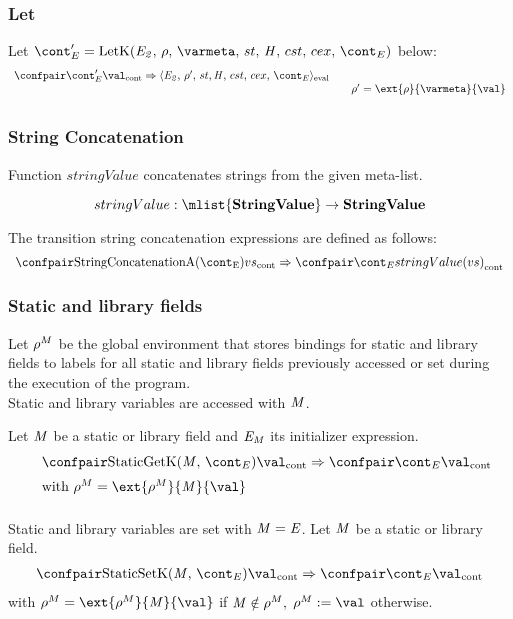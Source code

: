\documentclass{article}
\newcommand{\cesktrans}[2]{\ensuremath{{#1} \Rightarrow {#2}}}
\begin{document}
\subsubsection{Let}
Let $\econt' = \LetK{\expri{2}}{\env}{\varmeta}{\econt}$ below:
\[
  \begin{array}{rcl}
	\cesktrans{
		\contconf{\econt'}{\val}}{
		\evalconf{\expri{2}}{\env'}{\strace}{\cstrace}{\cex}{\econt}}
		\\
	&&\env'=\ext{\env}{\varmeta}{\val}\\[2mm]
  \end{array}
\]
\subsubsection{String Concatenation}
\label{subsubsec:string-concatenation}
Function $stringValue$ concatenates strings from the given meta-list.

\[stringValue : \mlist{\dstring} \rightarrow \dstring\]

\noindent
The transition string concatenation expressions are defined as follows:
\[
  \begin{array}{rcl}
	\cesktrans{
		\contconf{\StringConcatenationA}{\vals}}{
		\contconf{\econt}{stringValue(\vals)}}
  \end{array}
\]


\subsubsection{Static and library fields}
\label{subsubsec:static-and-library-fields}

Let $\rho^{M}$ be the global environment that stores bindings for static and library fields to labels for all static and library fields previously accessed or set during the execution of the program.\\
Static and library variables are accessed with $\mathit{M}$.

\noindent
Let $\mathit{M}$ be a static or library field and $\mathit{E}_{\mathit{M}}$ its initializer expression.
\[
  \begin{array}{rlcl}
	&\cesktrans{
		\contconf{\StaticGetK}{\val}}{
		\contconf{\econt}{\val}}
		\\[2mm]
	&\textrm{with }\env^{M} = \ext{\env^{M}}{\membermeta}{\val}
	\\[2mm]
  \end{array}
\]

Static and library variables are set with $\mathit{M}=\mathit{E}$.
Let $\mathit{M}$ be a static or library field.
\[
  \begin{array}{rcl}
	\cesktrans{
		\contconf{\StaticSetK}{\val}}{
		\contconf{\econt}{\val}}
  \end{array}
\]
with $\env^{M} = \ext{\env^{M}}{\membermeta}{\val}$ if $\mathit{M} \notin \rho^M,$ $\update{\env^{M}}{\val}$ otherwise.\\
\end{document}

